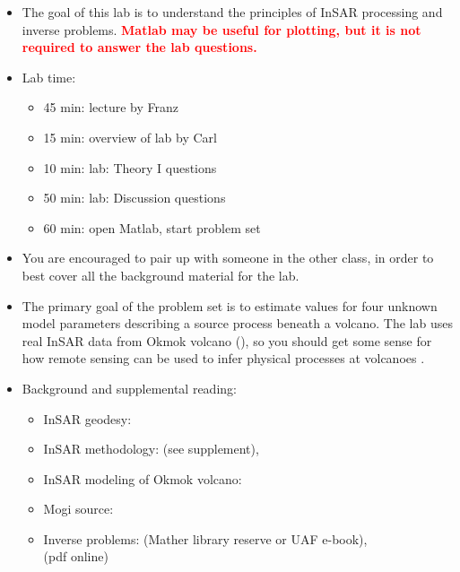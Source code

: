\documentclass[11pt,titlepage,fleqn]{article}
\begin{document}
\begin{itemize}
\item The goal of this lab is to understand the principles of InSAR processing and inverse problems. 
\textcolor{red}{\bf Matlab may be useful for plotting, but it is not required to answer the lab questions.}

\item Lab time:
%
\begin{itemize}
\item 45 min: lecture by Franz
\item 15 min: overview of lab by Carl
\item 10 min: lab: Theory I questions
\item 50 min: lab: Discussion questions
\item 60 min: open Matlab, start problem set
\end{itemize}

\item You are encouraged to pair up with someone in the other class, in order to best cover all the background material for the lab.

\item The primary goal of the problem set is to estimate values for four unknown model parameters describing a source process beneath a volcano. The lab uses real InSAR data from Okmok volcano (), so you should get some sense for how remote sensing can be used to infer physical processes at volcanoes \citep[\eg][]{ZLu2005}.

\item Background and supplemental reading:
%
\begin{itemize}
\item InSAR geodesy: \citet{Rosen2000,SimonsRosen2007}

\item InSAR methodology: \citet{Wright2003} (see supplement), \citet{ZLu2007}

\item InSAR modeling of Okmok volcano: \citet{ZLu2005}

\item Mogi source: \citet{Mogi1958}

\item Inverse problems: \citet{AsterE2} (Mather library reserve or UAF e-book), \\
\citet{Tarantola2005} (pdf online)

\end{itemize}

\end{itemize}
\end{document}
